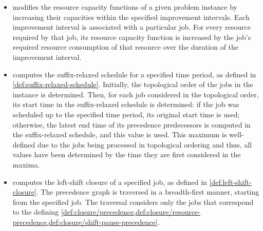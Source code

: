 \begin{itemize}
    \item {}
        modifies the resource capacity functions of a given problem instance
        by increasing their capacities within the specified improvement intervals.
        Each improvement interval is associated with a particular job.
        For every resource required by that job,
        its resource capacity function is increased by the job's required resource consumption of that resource
        over the duration of the improvement interval.

    \item {}
        computes the suffix-relaxed schedule for a specified time period,
        as defined in \cref{def:suffix-relaxed-schedule}.
        Initially, the topological order of the jobs in the instance is determined.
        Then, for each job considered in the topological order,
        its start time in the suffix-relaxed schedule is determined:
        if the job was scheduled up to the specified time period,
        its original start time is used;
        otherwise, the latest end time of its precedence predecessors is computed in the suffix-relaxed schedule,
        and this value is used.
        This maximum is well-defined due to the jobs being processed in topological ordering and thus,
        all values have been determined by the time they are first considered in the maxima.

    \item {}
        computes the left-shift closure of a specified job, as defined in \cref{def:left-shift-closure}.
        The precedence graph is traversed in a breadth-first manner, starting from the specified job.
        The traversal considers only the jobs that correspond to the defining
        \cref{def:closure/precedence,def:closure/resource-precedence,def:closure/shift-pause-precedence}.
\end{itemize}
